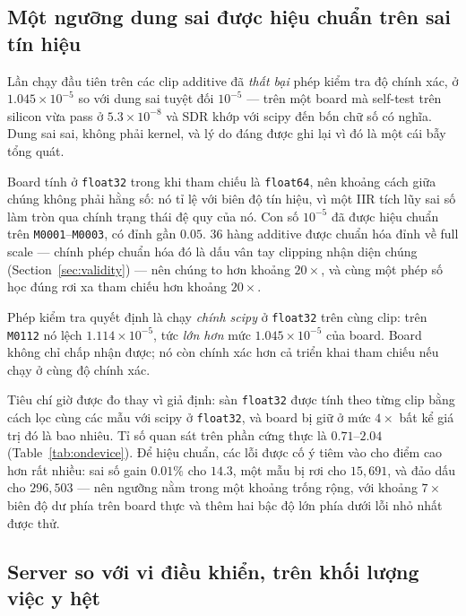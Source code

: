 \documentclass[11pt]{article}
\begin{document}
\subsection{Một ngưỡng dung sai được hiệu chuẩn trên sai tín hiệu}
\label{sec:firmware-tolerance}

Lần chạy đầu tiên trên các clip additive đã \emph{thất bại} phép kiểm tra
độ chính xác, ở $1.045\times10^{-5}$ so với dung sai tuyệt đối $10^{-5}$
--- trên một board mà self-test trên silicon vừa pass ở
$5.3\times10^{-8}$ và SDR khớp với scipy đến bốn chữ số có nghĩa. Dung sai
sai, không phải kernel, và lý do đáng được ghi lại vì đó là một cái bẫy
tổng quát.

Board tính ở \texttt{float32} trong khi tham chiếu là \texttt{float64},
nên khoảng cách giữa chúng không phải hằng số: nó tỉ lệ với biên độ tín
hiệu, vì một IIR tích lũy sai số làm tròn qua chính trạng thái đệ quy của
nó. Con số $10^{-5}$ đã được hiệu chuẩn trên \texttt{M0001}--\texttt{M0003},
có đỉnh gần $0.05$. 36 hàng additive được chuẩn hóa đỉnh về full scale
--- chính phép chuẩn hóa đó là dấu vân tay clipping nhận diện chúng
(Section~\ref{sec:validity}) --- nên chúng to hơn khoảng $20\times$, và
cùng một phép số học đúng rơi xa tham chiếu hơn khoảng $20\times$.

Phép kiểm tra quyết định là chạy \emph{chính scipy} ở \texttt{float32}
trên cùng clip: trên \texttt{M0112} nó lệch $1.114\times10^{-5}$, tức
\emph{lớn hơn} mức $1.045\times10^{-5}$ của board. Board không chỉ chấp
nhận được; nó còn chính xác hơn cả triển khai tham chiếu nếu chạy ở cùng
độ chính xác.

Tiêu chí giờ được đo thay vì giả định: sàn \texttt{float32} được tính
theo từng clip bằng cách lọc cùng các mẫu với scipy ở \texttt{float32}, và
board bị giữ ở mức $4\times$ bất kể giá trị đó là bao nhiêu. Tỉ số quan
sát trên phần cứng thực là $0.71$--$2.04$ (Table~\ref{tab:ondevice}). Để
hiệu chuẩn, các lỗi được cố ý tiêm vào cho điểm cao hơn rất nhiều: sai số
gain $0.01\%$ cho $14.3$, một mẫu bị rơi cho $15{,}691$, và đảo dấu cho
$296{,}503$ --- nên ngưỡng nằm trong một khoảng trống rộng, với khoảng
$7\times$ biên độ dư phía trên board thực và thêm hai bậc độ lớn phía dưới
lỗi nhỏ nhất được thử.

\subsection{Server so với vi điều khiển, trên khối lượng việc y hệt}
\label{sec:firmware-vs-server}
\end{document}
